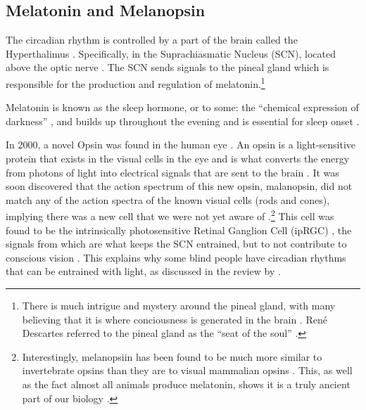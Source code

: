\subsection{Melatonin and Melanopsin}

The circadian rhythm is controlled by a part of the brain called the Hyperthalimus \citep{stephanCircadianRhythmsDrinking1972}. Specifically, in the Suprachiasmatic Nucleus (SCN), located above the optic nerve \citep{welshIndividualNeuronsDissociated1995}. The SCN sends signals to the pineal gland \citep{cassoneMelatoninRoleVertebrate1998, borjiginPINEALGLANDMELATONIN1999} which is responsible for the production and regulation of melatonin.\footnote{
There is much intrigue and mystery around the pineal gland, with many believing that it is where conciousness is generated in the brain \citep{bobMelatoninConsciousnessTraumatic2008}. Ren\'e Descartes referred to the pineal gland as the ``seat of the soul'' \citep{lokhorstDescartesPinealGland2020}.
}

Melatonin is known as the sleep hormone, or to some: the ``chemical expression of darkness'' \citep{reiterMelatoninChemicalExpression1991}, and builds up throughout the evening and is essential for sleep onset \citep{arendtImportanceRelevanceMelatonin2003}.

In 2000, a novel Opsin was found in the human eye \citep{provencioNovelHumanOpsin2000}. An opsin is a light-sensitive protein that exists in the visual cells in the eye and is what converts the energy from photons of light into electrical signals that are sent to the brain \citep{terakitaOpsins2005}. It was soon discovered that the action spectrum of this new opsin, malanopsin, did not match any of the action spectra of the known visual cells (rods and cones), implying there was a new cell that we were not yet aware of \citep{thapanActionSpectrumMelatonin2001}.\footnote{
Interestingly, melanopsiin has been found to be much more similar to invertebrate opsins than they are to visual mammalian opsins \citep{provencioMelanopsinOpsinMelanophores1998}. This, as well as the fact almost all animals produce melatonin, shows it is a truly ancient part of our biology \citep{daviesEvolutionFunctionMelanopsin2014}.
} 
This cell was found to be the intrinsically photosensitive Retinal Ganglion Cell (ipRGC) \citep{bersonPhototransductionRetinalGanglion2002}, the signals from which are what keeps the SCN entrained, but to not contribute to conscious vision \citep{bersonPhototransductionGanglioncellPhotoreceptors2007}. This explains why some blind people have circadian rhythms that can be entrained with light, as discussed in the review by \citet{allenCircadianRhythmsBlind2019}.

